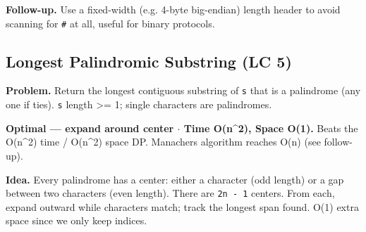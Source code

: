 \documentclass[11pt]{article}
\begin{document}
\textbf{Follow-up.} Use a fixed-width (e.g. 4-byte big-endian) length header to avoid scanning for \texttt{\#} at all, useful for binary protocols.

\subsection{Longest Palindromic Substring (LC 5)}\label{longest-palindromic-substring-lc-5}

\textbf{Problem.} Return the longest contiguous substring of \texttt{s} that is a palindrome (any one if ties). \texttt{s} length \textgreater= 1; single characters are palindromes.

\textbf{Optimal --- expand around center \(\cdot\) Time O(n\^{}2), Space O(1).} Beats the O(n\^{}2) time / O(n\^{}2) space DP. Manacher\textquotesingle s algorithm reaches O(n) (see follow-up).

\textbf{Idea.} Every palindrome has a center: either a character (odd length) or a gap between two characters (even length). There are \texttt{2n\ -\ 1} centers. From each, expand outward while characters match; track the longest span found. O(1) extra space since we only keep indices.

\end{document}
